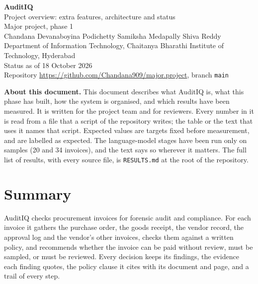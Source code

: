 \documentclass[11pt,a4paper]{article}
\begin{document}
\thispagestyle{empty}
\vspace*{1.5cm}
\begin{center}
{\fontsize{30}{34}\selectfont\bfseries\color{accent} AuditIQ}\\[6pt]
{\Large Project overview: extra features, architecture and status}\\[14pt]
Major project, phase 1\\[10pt]
{\large Chandana Devanaboyina \qquad Podichetty Samiksha \qquad Medapally Shiva Reddy}\\[4pt]
{\small Department of Information Technology, Chaitanya Bharathi Institute of Technology, Hyderabad}\\[14pt]
{\small Status as of 18 October 2026}\\
{\small Repository \url{https://github.com/Chandana909/major.project}, branch \texttt{main}}
\end{center}
\vspace{1.2cm}

\noindent\textbf{About this document.} This document describes what AuditIQ is, what this phase has built, how the system is organised, and which results have been measured. It is written for the project team and for reviewers. Every number in it is read from a file that a script of the repository writes; the table or the text that uses it names that script. Expected values are targets fixed before measurement, and are labelled as expected. The language-model stages have been run only on samples (20 and 34 invoices), and the text says so wherever it matters. The full list of results, with every source file, is \texttt{RESULTS.md} at the root of the repository.

\newpage
{\footnotesize\renewcommand{\addvspace}[1]{}\tableofcontents}
\newpage

\section{Summary}
AuditIQ checks procurement invoices for forensic audit and compliance. For each invoice it gathers the purchase order, the goods receipt, the vendor record, the approval log and the vendor's other invoices, checks them against a written policy, and recommends whether the invoice can be paid without review, must be sampled, or must be reviewed. Every decision keeps its findings, the evidence each finding quotes, the policy clause it cites with its document and page, and a trail of every step.
\end{document}
